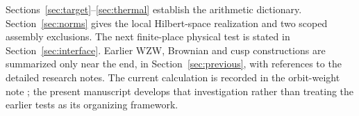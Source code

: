 Sections~\ref{sec:target}--\ref{sec:thermal} establish the arithmetic
dictionary. Section~\ref{sec:norms} gives the local Hilbert-space
realization and two scoped assembly exclusions. The next finite-place
physical test is stated in Section~\ref{sec:interface}. Earlier WZW,
Brownian and cusp constructions are summarized only near the end,
in Section~\ref{sec:previous}, with references to the detailed research
notes. The current calculation is recorded in the orbit-weight note
\cite{OrbitNote}; the present manuscript develops that investigation
rather than treating the earlier tests as its organizing framework.
